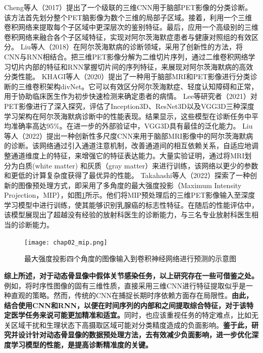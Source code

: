 Cheng等人\cite{cheng2017classification}（2017）提出了一个级联的三维CNN用于脑部PET影像的分类诊断。该方法首先划分整个PET脑影像为数个三维的局部子区域。接着，利用一个三维卷积网络来提取每个子区域中更深层次的鉴别特征。最后，应用一个高级别的三维卷积网络来融合各个子区域特征，实现对阿尔茨海默症患者与健康对照组的有效区分。
Liu等人\cite{liu2018classification}（2018）在阿尔茨海默病的诊断领域，采用了创新性的方法，将CNN与RNN相结合。把三维PET影像分解为二维切片序列，通过二维卷积网络学习切片内部的特征和RNN掌握切片间的序列特征，来展现对阿尔茨海默病的高效分类性能。
KHAGI等人\cite{khagi2020cnn}（2020）提出了一种用于脑部MRI和PET影像进行分类诊断的三维卷积架构divNet。它可以有效区分阿尔茨海默症、轻度认知障碍和正常，用于协助临床医生作为初步快速检测来确定患者的病情。
Lee等研究者\cite{lee2021performance}（2021）对PET影像进行了深入探究，评估了Inception3D、ResNet3D以及VGG3D三种深度学习架构在阿尔茨海默病诊断中的性能表现。结果显示，这些模型在诊断任务中平均准确率高达95\%。在进一步的外部验证中，VGG3D具有最佳的泛化能力。
Liu等人\cite{liu2022diagnosis}（2022）提出一种创新性多尺度CNN来用于脑部MRI影像中的阿尔茨海默病的诊断。该网络通过引入通道注意机制，改善通道间的相互依赖关系，自适应地调整通道维度上的特征，来增强它的特征表达能力。大量实验证明，通过将MRI划分为白质(white matter) 和灰质（gray matter）来进行训练，该网络以更少的参数和更低的计算复杂度获得了最优异的性能。
Takahashi等人\cite{takahashi2022deep}（2022）探索了一种创新的图像预处理方式，即采用了多角度的最大强度投影（Maximum Intensity Projection，MIP），如图\ref{fig:chap02_mip}所示。他们将MIP预处理后的三维PET影像输入至深度学习模型中进行训练，使其能够识别乳腺癌的标志性特征。在随后的性能评估中，该模型展现出了超越没有经验的放射科医生的诊断能力，与三名专业放射科医生相当的诊断能力。

\begin{figure}[htbp]
    \centering
    \texttt{[image: chap02\_mip.png]}
    \caption{最大强度投影四个角度的图像输入到卷积神经网络进行预测的示意图}
    \label{fig:chap02_mip}
\end{figure}

\textbf{综上所述，对于动态骨显像中假体关节感染任务，以上研究存在一些可借鉴之处。}例如，将时序性图像的固有三维性质，直接采用三维CNN进行特征提取似乎是一种直观的策略。然而，传统的CNN在捕捉长期时序依赖方面存在局限性。\textbf{由此，结合使用CNN和RNN，以便在时间序列的内部和之间提取综合特征，对于该特定医学任务来说可能更加精准和适宜。}同时，也应该重视任务的特定难点，比如无关区域干扰和生理状态下高摄取区域可能对分类精度造成的负面影响。\textbf{鉴于此，研究并设计针对动态骨显像的数据预处理方法，去有效减少负面影响，进一步优化深度学习模型的性能，是提高诊断精准度的关键。}

